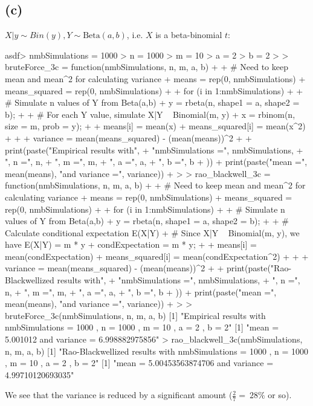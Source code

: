\documentclass{article}
\begin{document}
{\subsection*{(c)}

\(X | y \sim Bin(y), Y \sim \text{Beta}(a, b)\), i.e. \(X\) is a beta-binomial \(t\):
\begin{spverbatim}
asdf> nmbSimulations = 1000
> n = 1000
> m = 10
> a = 2
> b = 2
> 
> bruteForce_3c = function(nmbSimulations, n, m, a, b) {
+   
+   # Need to keep mean and mean^2 for calculating variance
+   means = rep(0, nmbSimulations)
+   means_squared = rep(0, nmbSimulations)
+   
+   for (i in 1:nmbSimulations) {
+     
+     # Simulate n values of Y from Beta(a,b)
+     y = rbeta(n, shape1 = a, shape2 = b);
+     
+     # For each Y value, simulate X|Y ~ Binomial(m, y)
+     x = rbinom(n, size = m, prob = y);
+     
+     means[i] = mean(x)
+     means_squared[i] = mean(x^2)
+   }
+   
+   variance = mean(means_squared) - (mean(means))^2
+   
+   print(paste("Empirical results with", 
+               "nmbSimulations =", nmbSimulations,
+               ", n =", n,
+               ", m =", m,
+               ", a =", a,
+               ", b =", b
+   ))
+   print(paste("mean =", mean(means), "and variance =", variance))
+ }
> 
> rao_blackwell_3c = function(nmbSimulations, n, m, a, b) {
+   
+   # Need to keep mean and mean^2 for calculating variance
+   means = rep(0, nmbSimulations)
+   means_squared = rep(0, nmbSimulations)
+   
+   for (i in 1:nmbSimulations) {
+     
+     # Simulate n values of Y from Beta(a,b)
+     y = rbeta(n, shape1 = a, shape2 = b);    
+     
+     # Calculate conditional expectation E(X|Y)
+     # Since X|Y ~ Binomial(m, y), we have E(X|Y) = m * y
+     condExpectation = m * y;
+     
+     means[i] = mean(condExpectation)
+     means_squared[i] = mean(condExpectation^2)
+   }
+ 
+   variance = mean(means_squared) - (mean(means))^2
+   
+   print(paste("Rao-Blackwellized results with", 
+               "nmbSimulations =", nmbSimulations,
+               ", n =", n,
+               ", m =", m,
+               ", a =", a,
+               ", b =", b
+   ))
+   print(paste("mean =", mean(means), "and variance =", variance))
+ }
> 
> bruteForce_3c(nmbSimulations, n, m, a, b)
[1] "Empirical results with nmbSimulations = 1000 , n = 1000 , m = 10 , a = 2 , b = 2"
[1] "mean = 5.001012 and variance = 6.998882975856"
> rao_blackwell_3c(nmbSimulations, n, m, a, b)
[1] "Rao-Blackwellized results with nmbSimulations = 1000 , n = 1000 , m = 10 , a = 2 , b = 2"
[1] "mean = 5.00453563874706 and variance = 4.99710120693035"
\end{spverbatim}
We see that the variance is reduced by a significant amount (\(\frac{2}{7} = ~28\%\) or so).

}
\end{document}
